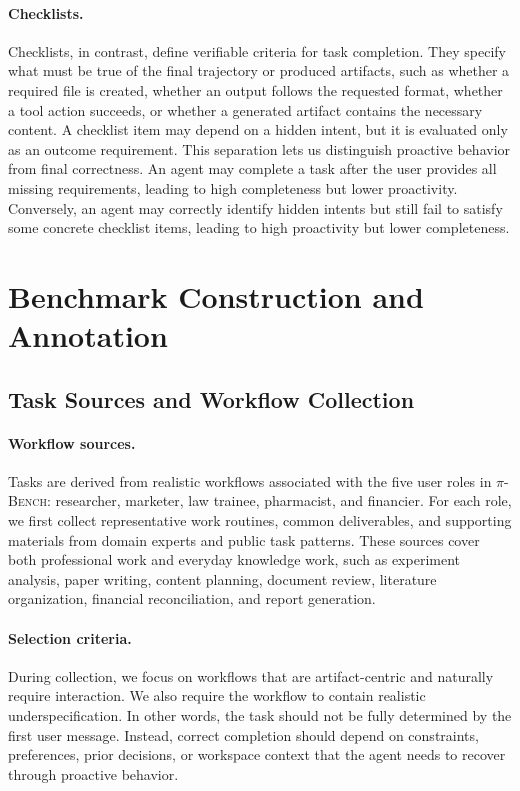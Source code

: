 \documentclass{llmxive}
\providecommand{\bench}{\textsc{$\pi$-Bench}}
\begin{document}
\paragraph{Checklists.}
Checklists, in contrast, define verifiable criteria for task completion. They specify what must be true of the final trajectory or produced artifacts, such as whether a required file is created, whether an output follows the requested format, whether a tool action succeeds, or whether a generated artifact contains the necessary content. A checklist item may depend on a hidden intent, but it is evaluated only as an outcome requirement. This separation lets us distinguish proactive behavior from final correctness. An agent may complete a task after the user provides all missing requirements, leading to high completeness but lower proactivity. Conversely, an agent may correctly identify hidden intents but still fail to satisfy some concrete checklist items, leading to high proactivity but lower completeness.
\section{Benchmark Construction and Annotation}
\label{app:data_construction}

\subsection{Task Sources and Workflow Collection}
\label{app:task_sources}

\paragraph{Workflow sources.}

Tasks are derived from realistic workflows associated with the five user roles in {\bench}: researcher, marketer, law trainee, pharmacist, and financier. For each role, we first collect representative work routines, common deliverables, and supporting materials from domain experts and public task patterns. These sources cover both professional work and everyday knowledge work, such as experiment analysis, paper writing, content planning, document review, literature organization, financial reconciliation, and report generation.

\paragraph{Selection criteria.}
During collection, we focus on workflows that are artifact-centric and naturally require interaction. We also require the workflow to contain realistic underspecification. In other words, the task should not be fully determined by the first user message. Instead, correct completion should depend on constraints, preferences, prior decisions, or workspace context that the agent needs to recover through proactive behavior.
\end{document}
